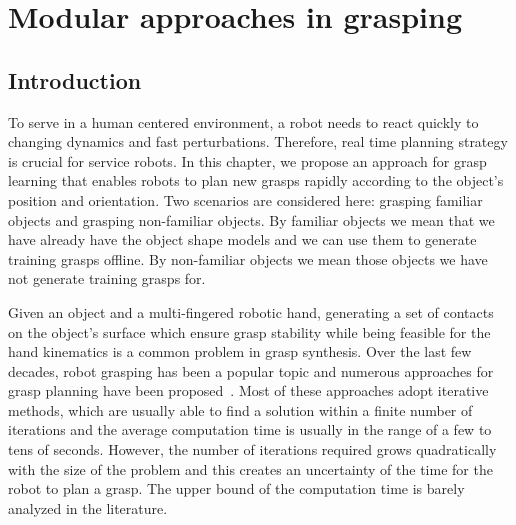 \chapter{Modular approaches in grasping}
\label{cha3}

\section{Introduction}
\label{cha3:sec1}

To serve in a human centered environment, a robot needs to react quickly to changing dynamics and fast perturbations. Therefore, real time planning strategy is crucial for service robots. In this chapter, we propose an approach for grasp learning that enables robots to plan new grasps rapidly according to the object’s position and orientation. Two scenarios are considered here: grasping familiar objects and grasping non-familiar objects. By familiar objects we mean that we have already have the object shape models and we can use them to generate training grasps offline. By non-familiar objects we mean those objects we have not generate training grasps for.


Given an object and a multi-fingered robotic hand,
generating a set of contacts on the object's surface which ensure grasp stability while being feasible for the hand kinematics is a common problem in grasp synthesis. Over the last few decades, robot grasping has been a popular topic and numerous approaches for grasp planning have been proposed~\cite{sahbani2011overview}. Most of these approaches adopt iterative methods, which are usually able to find a solution within a finite number of iterations and the average computation time is usually in the range of a few to tens of seconds. However, the number of iterations required grows quadratically with the size of the problem and this creates an uncertainty of the time for the robot to plan a grasp. The upper bound of the computation time is barely analyzed in the literature.

